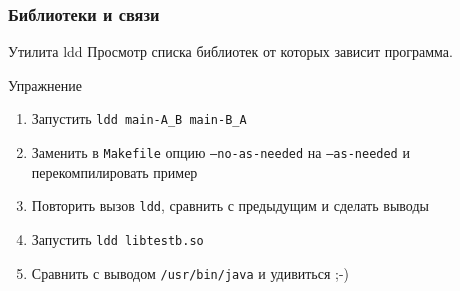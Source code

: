 
\begin{frame}
	\frametitle{Библиотеки и связи}

	\begin{block}{Утилита ldd}
		Просмотр списка библиотек от которых зависит программа.
	\end{block}

	\pause

	\begin{block}{Упражнение}
		\begin{enumerate}
			\item Запустить {\tt ldd main-A\_B main-B\_A}
			\item Заменить в {\tt Makefile} опцию {\tt --no-as-needed} на {\tt --as-needed}
				и перекомпилировать пример
			\item Повторить вызов {\tt ldd}, сравнить с предыдущим и сделать выводы
			\item Запустить {\tt ldd libtestb.so}
			\item Сравнить с выводом {\tt /usr/bin/java} и удивиться ;-)
		\end{enumerate}
	\end{block}

\end{frame}


